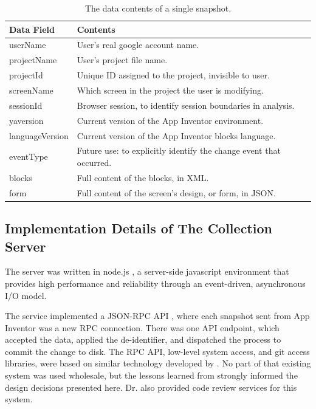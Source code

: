 \begin{table}
\begin{centering}
	\begin{tabular}{l l}
		Data Field 			& Contents \\ \hline
		userName  			& User's real google account name. \\
		projectName 		& User's project file name. 	\\
		projectId 			& Unique ID assigned to the project, invisible to user.	\\
		screenName 			& Which screen in the project the user is modifying.	\\
		sessionId 			& Browser session, to identify session boundaries in analysis.	\\
		yaversion 			& Current version of the App Inventor environment. 	\\
		languageVersion 	& Current version of the App Inventor blocks language. 	\\
		eventType 			& Future use: to explicitly identify the change event that occurred. 	\\
		blocks 				& Full content of the blocks, in XML. 	\\
		form 				& Full content of the screen's design, or form, in JSON.

	\end{tabular}
	\caption[Contents of a snapshot]{The data contents of a single snapshot.}
	\label{tab:snapshotPayload}
\end{centering}
\end{table}

\subsection{Implementation Details of The Collection Server}
The server was written in node.js \citep{nodejs}, a server-side javascript environment that provides high performance and reliability through an event-driven, asynchronous I/O model. %

The service implemented a JSON-RPC API \citep{jsonrpc}, where each snapshot sent from App Inventor was a new RPC connection. There was one API endpoint, which accepted the data, applied the de-identifier, and dispatched the process to commit the change to disk. The RPC API, low-level system access, and git access libraries, were based on similar technology developed by \citet{lipman-2011}. No part of that existing system was used wholesale, but the lessons learned from \citet{lipman-2014} strongly informed the design decisions presented here. Dr. \citeauthor{lipman-2014} also provided code review services for this system. %

